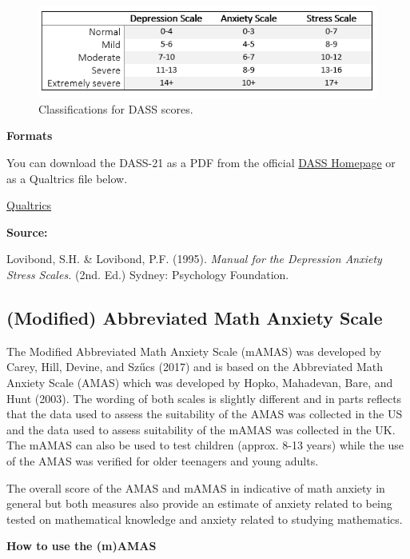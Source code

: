 \documentclass[
]{book}
\begin{document}
\begin{figure}

{\centering \includegraphics[width=0.8\linewidth]{images/DASS_Scoring} 

}

\caption{Classifications for DASS scores.}\label{fig:Figure8-1}
\end{figure}

\textbf{Formats}

You can download the DASS-21 as a PDF from the official \href{http://www2.psy.unsw.edu.au/groups/dass/}{DASS Homepage} or as a Qualtrics file below.

\href{questionnaires/DASS-21.qsf}{Qualtrics}

\textbf{Source:}

Lovibond, S.H. \& Lovibond, P.F. (1995). \emph{Manual for the Depression Anxiety Stress Scales.} (2nd. Ed.) Sydney: Psychology Foundation.

\hypertarget{modified-abbreviated-math-anxiety-scale}{%
\subsection{(Modified) Abbreviated Math Anxiety Scale}\label{modified-abbreviated-math-anxiety-scale}}

The Modified Abbreviated Math Anxiety Scale (mAMAS) was developed by Carey, Hill, Devine, and Szűcs (2017) and is based on the Abbreviated Math Anxiety Scale (AMAS) which was developed by Hopko, Mahadevan, Bare, and Hunt (2003). The wording of both scales is slightly different and in parts reflects that the data used to assess the suitability of the AMAS was collected in the US and the data used to assess suitability of the mAMAS was collected in the UK. The mAMAS can also be used to test children (approx. 8-13 years) while the use of the AMAS was verified for older teenagers and young adults.

The overall score of the AMAS and mAMAS in indicative of math anxiety in general but both measures also provide an estimate of anxiety related to being tested on mathematical knowledge and anxiety related to studying mathematics.

\textbf{How to use the (m)AMAS}
\end{document}
